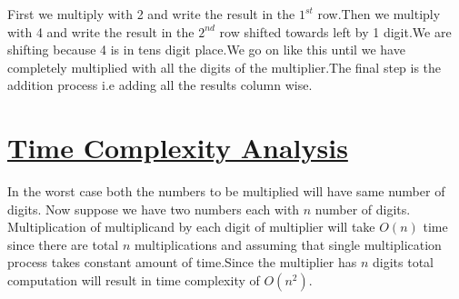 \documentclass[11pt]{article}
\begin{document}
First we multiply with 2 and write the result in the $1^{st}$ row.Then we multiply with 4 and write the result in the $2^{nd}$ row shifted towards left by 1 digit.We are shifting because 4 is in tens digit place.We go on like this until we have completely multiplied with all the digits of the multiplier.The final step is the addition process i.e adding all the results column wise.

\section*{\underline{Time Complexity Analysis}}
In the worst case both the numbers to be multiplied will have same number of digits. Now suppose we have two numbers each with $n$ number of digits. Multiplication of multiplicand by each digit of multiplier will take $O(n)$ time since there are total $n$ multiplications and assuming that single multiplication process takes constant amount of time.Since the multiplier has $n$ digits total computation will result in time complexity of  $O(n^2)$.
\end{document}
